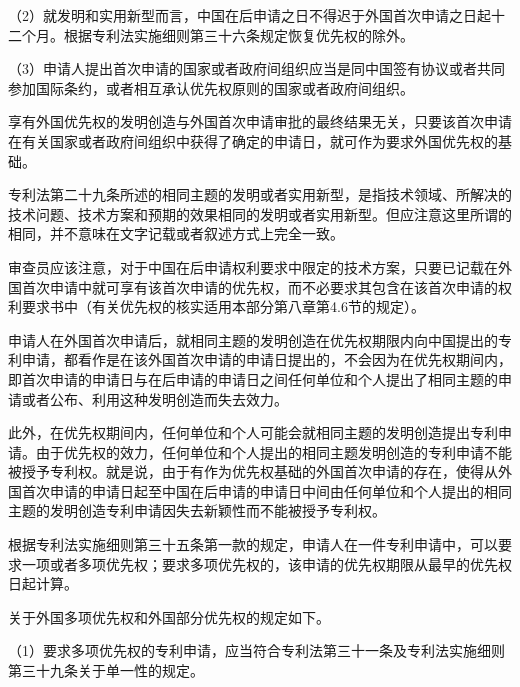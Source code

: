 {\setlength{\parindent}{17.1bp}（2）就发明和实用新型而言，中国在后申请之日不得迟于外国首次申请之日起十二个月。根据专利法实施细则第三十六条规定恢复优先权的除外。\par}

{\setlength{\parindent}{17.1bp}（3）申请人提出首次申请的国家或者政府间组织应当是同中国签有协议或者共同参加国际条约，或者相互承认优先权原则的国家或者政府间组织。\par}

享有外国优先权的发明创造与外国首次申请审批的最终结果无关，只要该首次申请在有关国家或者政府间组织中获得了确定的申请日，就可作为要求外国优先权的基础。

专利法第二十九条所述的相同主题的发明或者实用新型，是指技术领域、所解决的技术问题、技术方案和预期的效果相同的发明或者实用新型。但应注意这里所谓的相同，并不意味在文字记载或者叙述方式上完全一致。

审查员应该注意，对于中国在后申请权利要求中限定的技术方案，只要已记载在外国首次申请中就可享有该首次申请的优先权，而不必要求其包含在该首次申请的权利要求书中（有关优先权的核实适用本部分第八章第4.6节的规定）。

申请人在外国首次申请后，就相同主题的发明创造在优先权期限内向中国提出的专利申请，都看作是在该外国首次申请的申请日提出的，不会因为在优先权期间内，即首次申请的申请日与在后申请的申请日之间任何单位和个人提出了相同主题的申请或者公布、利用这种发明创造而失去效力。

此外，在优先权期间内，任何单位和个人可能会就相同主题的发明创造提出专利申请。由于优先权的效力，任何单位和个人提出的相同主题发明创造的专利申请不能被授予专利权。就是说，由于有作为优先权基础的外国首次申请的存在，使得从外国首次申请的申请日起至中国在后申请的申请日中间由任何单位和个人提出的相同主题的发明创造专利申请因失去新颖性而不能被授予专利权。

根据专利法实施细则第三十五条第一款的规定，申请人在一件专利申请中，可以要求一项或者多项优先权；要求多项优先权的，该申请的优先权期限从最早的优先权日起计算。

关于外国多项优先权和外国部分优先权的规定如下。

{\setlength{\parindent}{17.1bp}（1）要求多项优先权的专利申请，应当符合专利法第三十一条及专利法实施细则第三十九条关于单一性的规定。\par}

